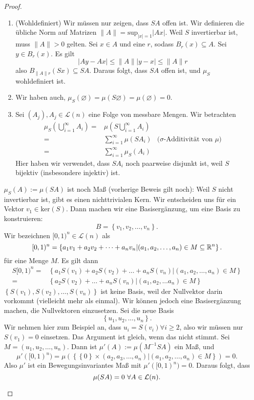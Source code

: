 \begin{proof}
\begin{parts}
\item 
	\begin{enumerate}[label=(\roman*)]
		\item (Wohldefiniert) Wir müssen nur zeigen, dass $SA$ offen ist. Wir definieren die übliche Norm auf Matrizen $\|A\|=\text{sup}_{|x|=1}|Ax|$. Weil $S$ invertierbar ist, muss $\|A\|>0$ gelten. Sei $x\in A$ und eine $r$, sodass $B_r(x)\subseteq A$. Sei $y\in B_r(x)$. Es gilt
			\[
			|Ay-Ax|\le \|A\| |y-x|\le \|A\|r
		\]
		also $B_{\|A\|r}(Sx)\subseteq SA$. Daraus folgt, dass $SA$ offen ist, und $\mu_S$ wohldefiniert ist.
	\item Wir haben auch, $\mu_S(\varnothing)=\mu(S\varnothing)=\mu(\varnothing)=0$.
	\item Sei  $(A_j), A_j\in \mathcal{L}(n)$ eine Folge von messbare Mengen. Wir betrachten
		\begin{align*}
			\mu_S\left(\bigcup_{i=1} ^\infty A_i\right)=&\mu\left( S\bigcup_{i=1}^\infty A_i\right) \\
			=& \sum_{i=1}^{\infty} \mu(SA_i) &(\sigma\text{-Additivität von $\mu$)}\\
			=&  \sum_{i=1}^{\infty} \mu_S(A_i)
		\end{align*}
		Hier haben wir verwendet, dass $SA_i$ noch paarweise disjunkt ist, weil $S$ bijektiv (insbesondere injektiv) ist.
	\end{enumerate}
\item $\mu_S(A):=\mu(SA)$ ist noch Maß (vorherige Beweis gilt noch): Weil $S$ nicht invertierbar ist, gibt es einen nichttrivialen Kern. Wir entscheiden uns f\"{u}r ein Vektor $v_1\in \text{ker}(S)$. Dann machen wir eine Basisergänzung, um eine Basis zu konstruieren:
	\[
	B=\left\{ v_1,v_2,\dots, v_n \right\} 
	.\] 
	Wir bezeichnen $[0,1)^n\in \mathcal{L}(n)$ als
	\[
	[0,1)^n=\left\{ a_1v_1+a_2v_2+\dots+a_nv_n|(a_1,a_2,\dots,a_n)\in M\subseteq \mathbb{R}^n \right\} 
	.\] 
	f\"{u}r eine Menge $M$. Es gilt dann
	\begin{align*}
		S[0,1)^n=&\left\{ a_1S(v_1)+a_2S(v_2)+\dots +a_nS(v_n)|(a_1,a_2,\dots, a_n)\in M \right\}\\
		=&\left\{ a_2S(v_2)+\dots+a_nS(v_n)|(a_1,a_2,\dots a_n)\in M \right\} 
\end{align*}
	$\left\{ S(v_1),S(v_2),\dots, S(v_n) \right\}$ ist keine Basis, weil der Nullvektor darin vorkommt (vielleicht mehr als einmal). Wir können jedoch eine Basisergänzung machen, die Nullvektoren einzusetzen. Sei die neue Basis
	\[
	\left\{ u_1,u_2,\dots, u_n \right\} 
	.\] 
	Wir nehmen hier zum Beispiel an, dass $u_i=S(v_i)\forall i\ge 2$, also wir müssen nur $S(v_1)=0$ einsetzen. Das Argument ist gleich, wenn das nicht stimmt. Sei $M=(u_1,u_2,\dots, u_n)$. Dann ist $\mu'(A):=\mu(M^{-1}SA)$ ein Maß, und
	\[
		\mu'([0,1)^n)=\mu(\left\{\left\{ 0 \right\} \times (a_2,a_3,\dots, a_n)|(a_1,a_2,\dots, a_n)\in M\right\})=0
	.\] 
	Also $\mu'$ ist ein Bewegungsinvariantes Maß mit $\mu'([0,1)^n)=0$. Daraus folgt, dass
	\[
	\mu(SA)=0~\forall A\in \mathcal{L}(n)
	.\qedhere\] 
\end{parts}	
\end{proof}
